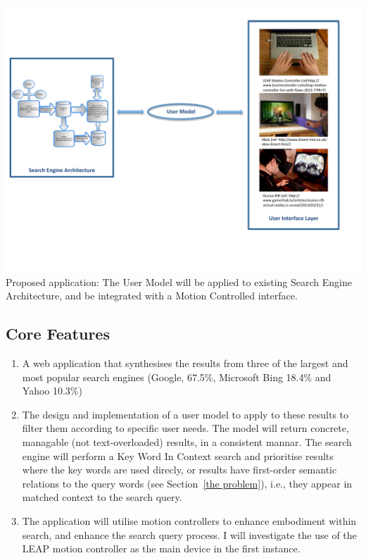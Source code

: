 \documentclass[10pt]{article}
\begin{document}
\begin{center}
\includegraphics[scale=0.7]{searchEngArchi}
Proposed application: The User Model will be applied to existing Search Engine Architecture\cite{seimage}, and be integrated with a Motion Controlled interface.
\end{center}


\subsection{Core Features}
\begin{enumerate}
\item  A web application that synthesises the results from three of the largest and most popular search engines (Google, 67.5\%, Microsoft Bing 18.4\% and Yahoo 10.3\%) \cite{adam}

\item The design and implementation of a user model to apply to these results to filter them according to specific user needs. The model will return concrete, managable (not text-overloaded) results, in a consistent mannar. The search engine will perform a Key Word In Context search and prioritise results where the key words are used direcly, or results have first-order semantic relations to the query words (see Section~\ref{the problem}), i.e., they appear in matched context to the search query.

\item The application will utilise motion controllers to enhance embodiment within search, and enhance the search query process. I will investigate the use of the LEAP motion controller as the main device in the first instance.
\end{enumerate}
\end{document}
